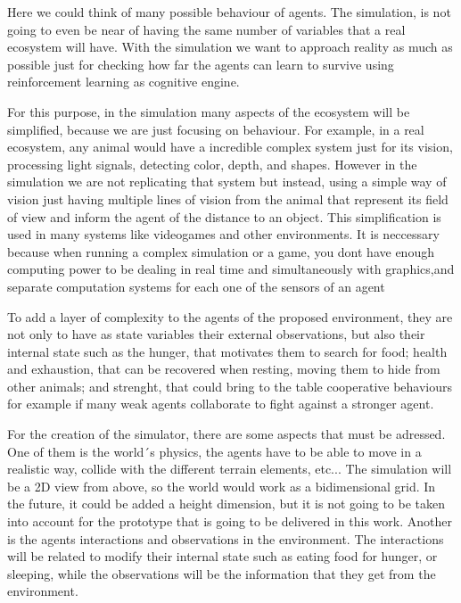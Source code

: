 Here we could think of many possible behaviour of agents. The simulation, is not going to even be near of having the same number of variables that a real ecosystem will have. With the simulation we want to approach reality as much as possible just for checking how far the agents can learn to survive using reinforcement learning as cognitive engine.

For this purpose, in the simulation many aspects of the ecosystem will be simplified, because we are just focusing on behaviour. For example, in a real ecosystem, any animal would have a incredible complex system just for its vision, processing light signals, detecting color, depth, and shapes. However in the simulation we are not replicating that system but instead, using a simple way of vision just having multiple lines of vision from the animal that represent its field of view and inform the agent of the distance to an object. This simplification is used in many systems like videogames and other environments. It is neccessary because when running a complex simulation or a game, you dont have enough computing power to be dealing in real time and simultaneously with graphics,and separate computation systems for each one of the sensors of an agent \cite{aiforgames}

To add a layer of complexity to the agents of the proposed environment, they are not only to have as state variables their external observations, but also their internal state such as the hunger, that motivates them to search for food; health and exhaustion, that can be recovered when resting, moving them to hide from other animals; and strenght, that could bring to the table cooperative behaviours for example if many weak agents collaborate to fight against a stronger agent.

For the creation of the simulator, there are some aspects that must be adressed. One of them is the world´s physics, the agents have to be able to move in a realistic way, collide with the different terrain elements, etc... The simulation will be a 2D view from above, so the world would work as a bidimensional grid. In the future, it could be added a height dimension, but it is not going to be taken into account for the prototype that is going to be delivered in this work. Another is the agents interactions and observations in the environment. The interactions will be related to modify their internal state such as eating food for hunger, or sleeping, while the observations will be the information that they get from the environment.

